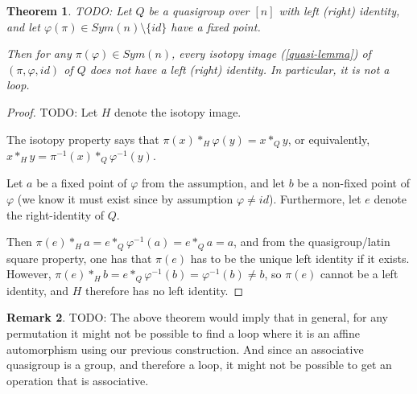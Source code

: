 \documentclass[a4paper, 12pt, english]{article}
\theoremstyle{plain}
\newtheorem{theorem}{Theorem}[section]
\theoremstyle{definition}
\newtheorem{remark}[theorem]{Remark}
\begin{document}
\begin{theorem}
    TODO:
    Let \( Q \) be a quasigroup over \( [n] \) with left (right) identity, and let \( \varphi (\pi) \in Sym(n) \setminus \{id\} \) have a fixed point.

    Then for any \( \pi (\varphi) \in Sym(n) \), every isotopy image (\autoref{quasi-lemma}) of \( (\pi, \varphi, id) \) of \( Q \) does \emph{not} have a left (right) identity. In particular, it is \emph{not} a loop.
\end{theorem}
\begin{proof}
    TODO:
    Let \( H \) denote the isotopy image. 
    
    The isotopy property says that \( \pi(x) *_H \varphi(y) = x *_Q y \), or equivalently, \( x *_H y = \pi^{-1}(x) *_Q \varphi^{-1}(y) \).

    Let \( a \) be a fixed point of \( \varphi \) from the assumption, and let \( b \) be a non-fixed point of \( \varphi \) (we know it must exist since by assumption \( \varphi \neq id \)). Furthermore, let \( e \) denote the right-identity of \( Q \).

    Then \( \pi(e) *_H a = e *_Q \varphi^{-1}(a) = e *_Q a = a \), and from the quasigroup/latin square property, one has that \( \pi(e) \) has to be the unique left identity if it exists. However, \( \pi(e) *_H b = e *_Q \varphi^{-1}(b) = \varphi^{-1}(b) \neq b \), so \( \pi(e) \) cannot be a left identity, and \( H \) therefore has no left identity.
\end{proof}

\begin{remark}
    TODO:
    The above theorem would imply that in general, for any permutation it might not be possible to find a loop where it is an affine automorphism using our previous construction. And since an associative quasigroup is a group, and therefore a loop, it might not be possible to get an operation that is associative.
\end{remark}
\end{document}
